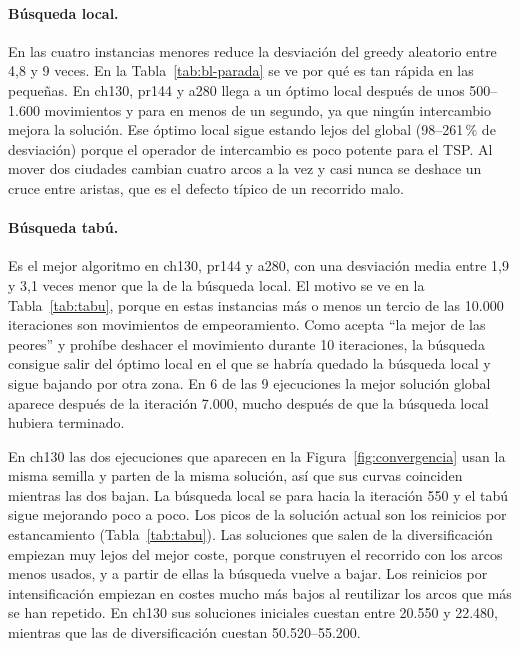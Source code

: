 \paragraph{Búsqueda local.} En las cuatro instancias menores reduce la desviación del greedy aleatorio entre 4,8 y 9 veces. En la Tabla~\ref{tab:bl-parada} se ve por qué es tan rápida en las pequeñas. En ch130, pr144 y a280 llega a un óptimo local después de unos 500--1.600 movimientos y para en menos de un segundo, ya que ningún intercambio mejora la solución. Ese óptimo local sigue estando lejos del global (98--261\,\% de desviación) porque el operador de intercambio es poco potente para el TSP. Al mover dos ciudades cambian cuatro arcos a la vez y casi nunca se deshace un cruce entre aristas, que es el defecto típico de un recorrido malo.



\paragraph{Búsqueda tabú.} Es el mejor algoritmo en ch130, pr144 y a280, con una desviación media entre 1,9 y 3,1 veces menor que la de la búsqueda local. El motivo se ve en la Tabla~\ref{tab:tabu}, porque en estas instancias más o menos un tercio de las 10.000 iteraciones son movimientos de empeoramiento. Como acepta ``la mejor de las peores'' y prohíbe deshacer el movimiento durante 10 iteraciones, la búsqueda consigue salir del óptimo local en el que se habría quedado la búsqueda local y sigue bajando por otra zona. En 6 de las 9 ejecuciones la mejor solución global aparece después de la iteración 7.000, mucho después de que la búsqueda local hubiera terminado.

En ch130 las dos ejecuciones que aparecen en la Figura~\ref{fig:convergencia} usan la misma semilla y parten de la misma solución, así que sus curvas coinciden mientras las dos bajan. La búsqueda local se para hacia la iteración 550 y el tabú sigue mejorando poco a poco. Los picos de la solución actual son los reinicios por estancamiento (Tabla~\ref{tab:tabu}). Las soluciones que salen de la diversificación empiezan muy lejos del mejor coste, porque construyen el recorrido con los arcos menos usados, y a partir de ellas la búsqueda vuelve a bajar. Los reinicios por intensificación empiezan en costes mucho más bajos al reutilizar los arcos que más se han repetido. En ch130 sus soluciones iniciales cuestan entre 20.550 y 22.480, mientras que las de diversificación cuestan 50.520--55.200.

